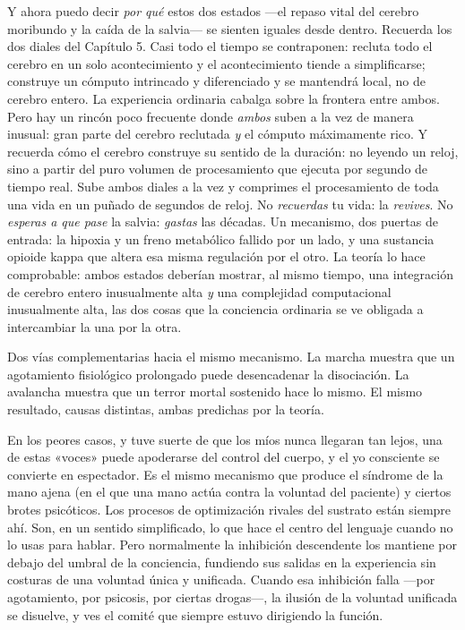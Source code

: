 \documentclass[11pt, twoside, openright]{book}
\begin{document}
Y ahora puedo decir \textit{por qué} estos dos estados ---el repaso vital del cerebro moribundo y la caída de la salvia--- se sienten iguales desde dentro. Recuerda los dos diales del Capítulo 5. Casi todo el tiempo se contraponen: recluta todo el cerebro en un solo acontecimiento y el acontecimiento tiende a simplificarse; construye un cómputo intrincado y diferenciado y se mantendrá local, no de cerebro entero. La experiencia ordinaria cabalga sobre la frontera entre ambos. Pero hay un rincón poco frecuente donde \textit{ambos} suben a la vez de manera inusual: gran parte del cerebro reclutada \textit{y} el cómputo máximamente rico. Y recuerda cómo el cerebro construye su sentido de la duración: no leyendo un reloj, sino a partir del puro volumen de procesamiento que ejecuta por segundo de tiempo real. Sube ambos diales a la vez y comprimes el procesamiento de toda una vida en un puñado de segundos de reloj. No \textit{recuerdas} tu vida: la \textit{revives}. No \textit{esperas a que pase} la salvia: \textit{gastas} las décadas. Un mecanismo, dos puertas de entrada: la hipoxia y un freno metabólico fallido por un lado, y una sustancia opioide kappa que altera esa misma regulación por el otro. La teoría lo hace comprobable: ambos estados deberían mostrar, al mismo tiempo, una integración de cerebro entero inusualmente alta \textit{y} una complejidad computacional inusualmente alta, las dos cosas que la conciencia ordinaria se ve obligada a intercambiar la una por la otra.

Dos vías complementarias hacia el mismo mecanismo. La marcha muestra que un agotamiento fisiológico prolongado puede desencadenar la disociación. La avalancha muestra que un terror mortal sostenido hace lo mismo. El mismo resultado, causas distintas, ambas predichas por la teoría.

En los peores casos, y tuve suerte de que los míos nunca llegaran tan lejos, una de estas «voces» puede apoderarse del control del cuerpo, y el yo consciente se convierte en espectador. Es el mismo mecanismo que produce el síndrome de la mano ajena (en el que una mano actúa contra la voluntad del paciente) y ciertos brotes psicóticos. Los procesos de optimización rivales del sustrato están siempre ahí. Son, en un sentido simplificado, lo que hace el centro del lenguaje cuando no lo usas para hablar. Pero normalmente la inhibición descendente los mantiene por debajo del umbral de la conciencia, fundiendo sus salidas en la experiencia sin costuras de una voluntad única y unificada. Cuando esa inhibición falla ---por agotamiento, por psicosis, por ciertas drogas---, la ilusión de la voluntad unificada se disuelve, y ves el comité que siempre estuvo dirigiendo la función.
\end{document}
